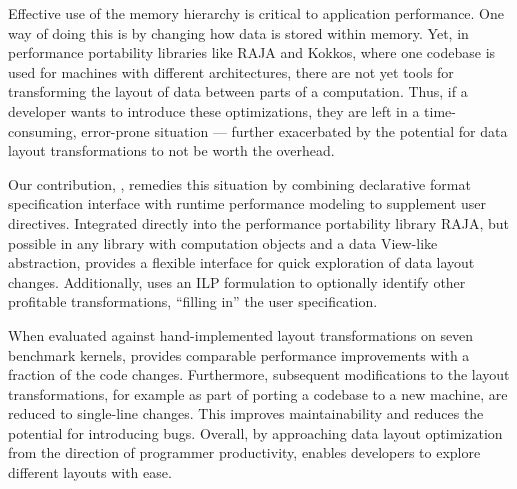 Effective use of the memory hierarchy is critical to application performance.
One way of doing this is by changing how data is stored within memory.
Yet, in performance portability libraries like RAJA and Kokkos, where one codebase is used for machines with different architectures, there are not yet tools for transforming the layout of data between parts of a computation. 
Thus, if a developer wants to introduce these optimizations, they are left in a time-consuming, error-prone situation --- further exacerbated by the potential for data layout transformations to not be worth the overhead.

Our contribution, \FormatDecisions, remedies this situation by combining declarative format specification  interface with runtime performance modeling to supplement user directives.
Integrated directly into the performance portability library RAJA, but possible in any library with computation objects and a data View-like abstraction, \FormatDecisions{} provides a flexible interface for quick exploration of data layout changes. 
Additionally, \FormatDecisions{} uses an ILP formulation to optionally identify other profitable transformations, \enquote{filling in} the user specification.

When evaluated against hand-implemented layout transformations on seven benchmark kernels, \FormatDecisions{} provides comparable performance improvements with a fraction of the code changes.
Furthermore, subsequent modifications to the layout transformations, for example as part of porting a codebase to a new machine, are reduced to single-line changes. 
This improves maintainability and reduces the potential for introducing bugs.
Overall, by approaching data layout optimization from the direction of programmer productivity, \FormatDecisions{} enables developers to explore different layouts with ease. 



